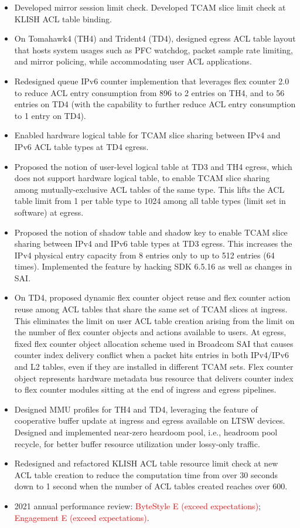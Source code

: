 \documentclass[letterpaper,11pt]{article}
\newcommand{\resitem}[1]{\item #1 \vspace{-2pt}}
\begin{document}
\begin{CJK}{UTF8}{gbsn}
\begin{itemize}
\begin{itemize}
  \resitem{Developed mirror session limit check. Developed TCAM slice limit check at KLISH ACL table binding.}
  \resitem{On Tomahawk4 (TH4) and Trident4 (TD4), designed egress ACL table layout that hosts system usages such as PFC watchdog,
  packet sample rate limiting, and mirror policing,
  while accommodating user ACL applications.}
  \resitem{Redesigned queue IPv6 counter implemention that leverages flex counter 2.0 to reduce ACL entry consumption from 896 to 2 entries on TH4,
  and to 56 entries on TD4 (with the capability to further reduce ACL entry consumption to 1 entry on TD4).}
  \resitem{Enabled hardware logical table for TCAM slice sharing between IPv4 and IPv6 ACL table types at TD4 egress.}
  \resitem{Proposed the notion of user-level logical table at TD3 and TH4 egress, which does not support hardware logical table,
  to enable TCAM slice sharing among mutually-exclusive ACL tables of the same type. This lifts the ACL table limit from 1 per table type
  to 1024 among all table types (limit set in software) at egress.}
  \resitem{Proposed the notion of shadow table and shadow key to enable TCAM slice sharing between IPv4 and IPv6 table types at TD3 egress.
  This increases the IPv4 physical entry capacity from 8 entries only to up to 512 entries (64 times).
  Implemented the feature by hacking SDK 6.5.16 as well as changes in SAI.}
  \resitem{On TD4, proposed dynamic flex counter object reuse and flex counter action reuse among ACL tables that share the same set of TCAM slices
  at ingress. This eliminates the limit on user ACL table creation arising from the limit on the number of flex counter objects and actions
  available to users.
  At egress, fixed flex counter object allocation scheme used in Broadcom SAI that causes counter index delivery conflict
  when a packet hits entries in both IPv4/IPv6 and L2 tables, even if they are installed in different TCAM sets.
  Flex counter object represents hardware metadata bus resource that delivers counter index to flex counter modules sitting
  at the end of ingress and egress pipelines.}
  \resitem{Designed MMU profiles for TH4 and TD4, leveraging the feature of cooperative buffer update at ingress and egress
  available on LTSW devices.
  Designed and implemented near-zero heardoom pool, i.e., headroom pool recycle, for better buffer resource utilization under lossy-only traffic.}
  \resitem{Redesigned and refactored KLISH ACL table resource limit check at new ACL table creation
  to reduce the computation time from over 30 seconds down to 1 second when the number of ACL tables created reaches over 600.}
  \resitem{2021 annual performance review: \textcolor{Red}{ByteStyle E (exceed expectations)}; \textcolor{Red}{Engagement E (exceed expectations)}.}


\end{itemize}
\end{itemize}
\end{CJK}
\end{document}
